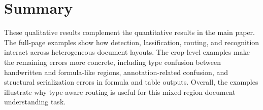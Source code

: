 \documentclass[runningheads]{llncs}
\begin{document}
\section{Summary}
\label{sec:summary}

These qualitative results complement the quantitative results in the main paper. The full-page examples show how detection, lassification, routing, and recognition interact across heterogeneous document layouts. The crop-level examples make the remaining errors more concrete, including type confusion between handwritten and formula-like regions, annotation-related confusion, and structural serialization errors in formula and table outputs. Overall, the examples illustrate why type-aware routing is useful for this mixed-region document understanding task.

% 
% 
\end{document}

